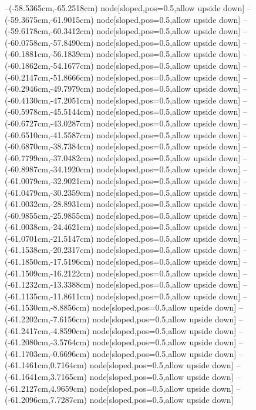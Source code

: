 --(-58.5365cm,-65.2518cm) node[sloped,pos=0.5,allow upside down]{\ArrowIn}
--(-59.3675cm,-61.9015cm) node[sloped,pos=0.5,allow upside down]{\ArrowIn}
--(-59.6178cm,-60.3412cm) node[sloped,pos=0.5,allow upside down]{\ArrowIn}
--(-60.0758cm,-57.8490cm) node[sloped,pos=0.5,allow upside down]{\ArrowIn}
--(-60.1881cm,-56.1839cm) node[sloped,pos=0.5,allow upside down]{\ArrowIn}
--(-60.1862cm,-54.1677cm) node[sloped,pos=0.5,allow upside down]{\ArrowIn}
--(-60.2147cm,-51.8666cm) node[sloped,pos=0.5,allow upside down]{\ArrowIn}
--(-60.2946cm,-49.7979cm) node[sloped,pos=0.5,allow upside down]{\ArrowIn}
--(-60.4130cm,-47.2051cm) node[sloped,pos=0.5,allow upside down]{\ArrowIn}
--(-60.5978cm,-45.5144cm) node[sloped,pos=0.5,allow upside down]{\ArrowIn}
--(-60.6727cm,-43.0287cm) node[sloped,pos=0.5,allow upside down]{\ArrowIn}
--(-60.6510cm,-41.5587cm) node[sloped,pos=0.5,allow upside down]{\ArrowIn}
--(-60.6870cm,-38.7384cm) node[sloped,pos=0.5,allow upside down]{\ArrowIn}
--(-60.7799cm,-37.0482cm) node[sloped,pos=0.5,allow upside down]{\ArrowIn}
--(-60.8987cm,-34.1920cm) node[sloped,pos=0.5,allow upside down]{\ArrowIn}
--(-61.0079cm,-32.9021cm) node[sloped,pos=0.5,allow upside down]{\ArrowIn}
--(-61.0479cm,-30.2359cm) node[sloped,pos=0.5,allow upside down]{\ArrowIn}
--(-61.0032cm,-28.8931cm) node[sloped,pos=0.5,allow upside down]{\ArrowIn}
--(-60.9855cm,-25.9855cm) node[sloped,pos=0.5,allow upside down]{\ArrowIn}
--(-61.0038cm,-24.4621cm) node[sloped,pos=0.5,allow upside down]{\ArrowIn}
--(-61.0701cm,-21.5147cm) node[sloped,pos=0.5,allow upside down]{\ArrowIn}
--(-61.1538cm,-20.2317cm) node[sloped,pos=0.5,allow upside down]{\ArrowIn}
--(-61.1850cm,-17.5196cm) node[sloped,pos=0.5,allow upside down]{\ArrowIn}
--(-61.1509cm,-16.2122cm) node[sloped,pos=0.5,allow upside down]{\ArrowIn}
--(-61.1232cm,-13.3388cm) node[sloped,pos=0.5,allow upside down]{\ArrowIn}
--(-61.1135cm,-11.8611cm) node[sloped,pos=0.5,allow upside down]{\ArrowIn}
--(-61.1530cm,-8.8856cm) node[sloped,pos=0.5,allow upside down]{\ArrowIn}
--(-61.2202cm,-7.6156cm) node[sloped,pos=0.5,allow upside down]{\ArrowIn}
--(-61.2417cm,-4.8590cm) node[sloped,pos=0.5,allow upside down]{\ArrowIn}
--(-61.2080cm,-3.5764cm) node[sloped,pos=0.5,allow upside down]{\ArrowIn}
--(-61.1703cm,-0.6696cm) node[sloped,pos=0.5,allow upside down]{\ArrowIn}
--(-61.1461cm,0.7164cm) node[sloped,pos=0.5,allow upside down]{\ArrowIn}
--(-61.1641cm,3.7165cm) node[sloped,pos=0.5,allow upside down]{\ArrowIn}
--(-61.2127cm,4.9659cm) node[sloped,pos=0.5,allow upside down]{\ArrowIn}
--(-61.2096cm,7.7287cm) node[sloped,pos=0.5,allow upside down]{\ArrowIn}
